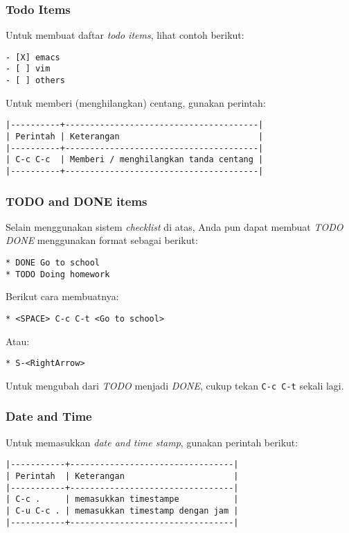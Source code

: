 \documentclass{article}
\begin{document}
\subsubsection{Todo Items}
Untuk membuat daftar \emph{todo items}, lihat contoh berikut:

\begin{verbatim}
- [X] emacs
- [ ] vim
- [ ] others
\end{verbatim}

Untuk memberi (menghilangkan) centang, gunakan perintah:

\begin{verbatim}
|----------+---------------------------------------|
| Perintah | Keterangan                            |
|----------+---------------------------------------|
| C-c C-c  | Memberi / menghilangkan tanda centang |
|----------+---------------------------------------|
\end{verbatim}

\subsubsection{TODO and DONE items}
Selain menggunakan sistem \emph{checklist} di atas, Anda pun dapat membuat
\emph{TODO DONE} menggunakan format sebagai berikut:

\begin{verbatim}
* DONE Go to school
* TODO Doing homework
\end{verbatim}

Berikut cara membuatnya:

\begin{verbatim}
* <SPACE> C-c C-t <Go to school>
\end{verbatim}

Atau:

\begin{verbatim}
* S-<RightArrow>
\end{verbatim}

Untuk mengubah dari \emph{TODO} menjadi \emph{DONE}, cukup tekan
\verb=C-c C-t= sekali lagi.

\subsubsection{Date and Time}
Untuk memasukkan \emph{date and time stamp}, gunakan perintah berikut:

\begin{verbatim}
|-----------+---------------------------------|
| Perintah  | Keterangan                      |
|-----------+---------------------------------|
| C-c .     | memasukkan timestampe           |
| C-u C-c . | memasukkan timestamp dengan jam |
|-----------+---------------------------------|
\end{verbatim}
\end{document}
